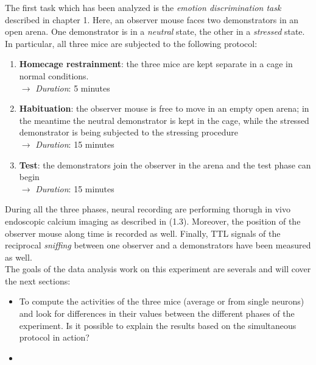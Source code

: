 \documentclass[a4paper]{article}
\begin{document}
The first task which has been analyzed is the \textit{emotion discrimination task} described in chapter 1. Here, an observer mouse faces two demonstrators in an open arena. One demonstrator is in a \textit{neutral} state, the other in a \textit{stressed} state. In particular, all three mice are subjected to the following protocol:

\begin{enumerate}
	
	\item \textbf{Homecage restrainment}: the three mice are kept separate in a cage in normal conditions. \\
	$\longrightarrow$ \textit{Duration}: 5 minutes
	
	\item \textbf{Habituation}: the observer mouse is free to move in an empty open arena; in the meantime the neutral demonstrator is kept in the cage, while the stressed demonstrator is being subjected to the stressing procedure \\
	$\longrightarrow$  \textit{Duration}: 15 minutes
	
	\item \textbf{Test}: the demonstrators join the observer in the arena and the test phase can begin \\
	$\longrightarrow$  \textit{Duration}: 15 minutes
\end{enumerate}

During all the three phases, neural recording are performing thorugh in vivo endoscopic calcium imaging as described in (1.3). Moreover, the position of the observer mouse along time is recorded as well. Finally, TTL signals of the reciprocal \textit{sniffing} between one observer and a demonstrators have been measured as well.\\
The goals of the data analysis work on this experiment are severals and will cover the next sections:
\begin{itemize}
	\item To compute the activities of the three mice (average or from single neurons) and look for differences in their values between the different phases of the experiment. Is it possible to explain the results based on the simultaneous protocol in action?
	
	\item 
\end{itemize}
\end{document}
